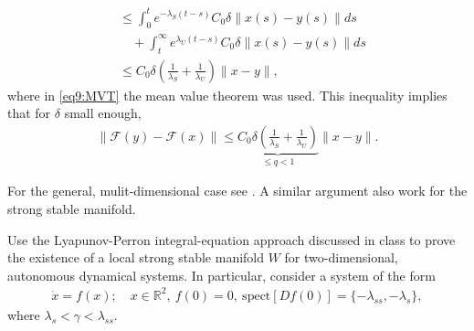 \begin{enumerate}
\begin{align}
					    &\leq \int_{0}^{t} e^{-\lambda _{S}(t-s)}C_0 \delta \| x(s) - y(s)\| ds \\
					    &\quad + \int_{t}^{\infty } e^{\lambda _{U}(t-s)}C_0 \delta \|x(s) - y(s)\| ds \label{eq9:MVT}\\
					    &\leq C_0 \delta \left(\frac{1}{\lambda _{S}} + \frac{1}{\lambda _{U}} \right) \| x - y\|,
\end{align}
where in \eqref{eq9:MVT} the mean value theorem was used. This inequality implies that for $\delta$ small enough,
\begin{align}
	\|\mathcal{F}(y) - \mathcal{F}(x) \| \leq \underbrace{C_0 \delta \left( \frac{1}{\lambda_S} + \frac{1}{\lambda _{U}}\right) }_{\leq q < 1} \| x - y\|.
\end{align}
\end{enumerate}
For the general, mulit-dimensional case see \cite{Chicone}. A similar argument also work for the strong stable manifold.

\begin{exercise}
Use the Lyapunov-Perron integral-equation approach discussed in class to prove the existence of a local strong stable manifold $W$ for two-dimensional, autonomous dynamical systems. In particular, consider a system of the form
\begin{align}
\dot{x} = f(x); \quad x\in \mathbb{R}^2,\ f(0)= 0,\ \textrm{spect}[Df(0)] = \{ -\lambda_{ss}, -\lambda_s\},
\end{align}
where $\lambda_s < \gamma < \lambda_{ss}$.
\end{exercise}


